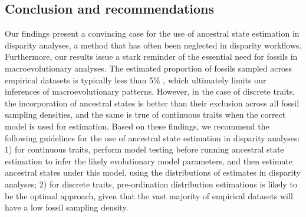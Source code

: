 \documentclass[11pt, a4paper]{article}
\begin{document}
\subsection{Conclusion and recommendations}
Our findings present a convincing case for the use of ancestral state estimation in disparity analyses, a method that has often been neglected in disparity workflows.
Furthermore, our results issue a stark reminder of the essential need for fossils in macroevolutionary analyses.
The estimated proportion of fossils sampled across empirical datasets is typically less than 5\% \citep{raup1976species}, which ultimately limits our inferences of macroevolutionary patterns.
However, in the case of discrete traits, the incorporation of ancestral states is better than their exclusion across all fossil sampling densities, and the same is true of continuous traits when the correct model is used for estimation.
Based on these findings, we recommend the following guidelines for the use of ancestral state estimation in disparity analyses: 
1) for continuous traits, perform model testing before running ancestral state estimation to infer the likely evolutionary model parameters, and then estimate ancestral states under this model, using the distributions of estimates in disparity analyses; 
2) for discrete traits, pre-ordination distribution estimations is likely to be the optimal approach, given that the vast majority of empirical datasets will have a low fossil sampling density.





\end{document}
